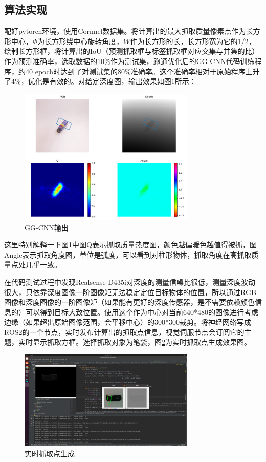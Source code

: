 \documentclass[fontset=fandol,type=bachelor,campus=harbin,bsmainpagenumberline=true]{hithesisbook}
\begin{document}
\subsection{算法实现}
配好pytorch环境，使用Cornnel数据集。将计算出的最大抓取质量像素点作为长方形中心，$\varPhi$为长方形绕中心旋转角度，$W$作为长方形的长，长方形宽为它的1/2，绘制长方形框，将计算出的IoU（预测抓取框与标签抓取框对应交集与并集的比）作为预测准确率，选取数据的10\%作为测试集，跑通优化后的GG-CNN代码训练程序，约40 epoch时达到了对测试集的80\%准确率。这个准确率相对于原始程序上升了4\%，优化是有效的。对给定深度图，输出效果如图\ref{GG-CNN输出（初始）}所示：
\begin{figure}[h]
\centering
\includegraphics[width = 0.75\textwidth]{chapter3/GG-CNN输出（初始）}
\caption{GG-CNN输出}
\label{GG-CNN输出（初始）}
\end{figure}


这里特别解释一下图\ref{GG-CNN输出（初始）}中图Q表示抓取质量热度图，颜色越偏暖色越值得被抓，图Angle表示抓取角度图，单位是弧度，可以看到对柱形物体，抓取角度在高抓取质量点处几乎一致。


在代码测试过程中发现Realsense D435i对深度的测量信噪比很低，测量深度波动很大，只依靠深度图像一阶图像矩无法稳定定位目标物体的位置，所以通过RGB图像和深度图像的一阶图像矩（如果能有更好的深度传感器，是不需要依赖颜色信息的）可以得到目标大致位置。使用这个作为中心对当前640*480的图像进行考虑边缘（如果超出原始图像范围，会平移中心）的300*300裁剪。将神经网络写成ROS2的一个节点，实时发布计算出的抓取点信息，视觉伺服节点会订阅它的主题，实时显示抓取方框。选择抓取对象为笔袋，图\ref{实时抓取点生成}为实时抓取点生成效果图。
\begin{figure}[h]
\centering
\includegraphics[width = 0.75\textwidth]{chapter3/实时抓取点生成}
\caption{实时抓取点生成}
\label{实时抓取点生成}
\end{figure}
\end{document}
